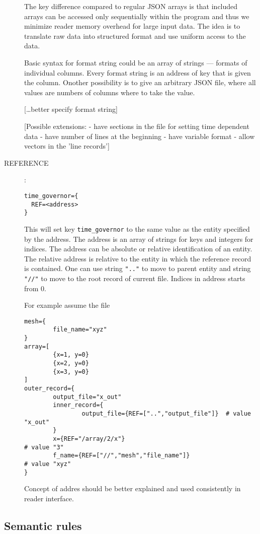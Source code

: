 \begin{description}
The key difference compared to regular JSON arrays is that included arrays can be accessed only sequentially 
within the program and thus we minimize reader memory overhead for large input data. The idea is to translate raw data into structured
format and use uniform access to the data.

Basic syntax for format string could be an array of strings --- formats of individual columns.
Every format string is an address of key that is given the column. Onother possibility is to give an arbitrary 
JSON file, where all values are numbers of columns where to take the value.

[\dots better specify format string]


[Possible extensions:
- have sections in the file for setting time dependent data
- have number of lines at the beginning
- have variable format
- allow vectors in the 'line records']

\item[REFERENCE]:\\
\begin{verbatim}
time_governor={
  REF=<address>
}
\end{verbatim}
This will set key \verb'time_governor' to the same value as the entity specified by the address.
The address is an array of strings for keys and integers for indices.
The address can be absolute or relative identification of an entity. The relative address is relative to the entity in which the reference record is contained.
One can use string \verb'".."' to move to parent entity and string \verb'"//"' to move to the root record of current file.
Indices in address starts from 0.

For example assume the file
\begin{verbatim}
mesh={
        file_name="xyz"
}
array=[
        {x=1, y=0}       
        {x=2, y=0}
        {x=3, y=0}
]               
outer_record={
        output_file="x_out"
        inner_record={
                output_file={REF=["..","output_file"]}  # value "x_out"
        }
        x={REF="/array/2/x"}                                    # value "3"
        f_name={REF=["//","mesh","file_name"]}                  # value "xyz"
}       
\end{verbatim}

Concept of addres should be better explained and used consistently in reader interface.
\end{description}

\subsection{Semantic rules}

